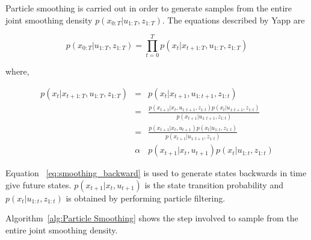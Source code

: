 \documentclass[12pt]{dalcsthesis}
\begin{document}
Particle smoothing is carried out in order to generate samples from the entire joint smoothing density $p(x_{0:T}|u_{1:T},z_{1:T})$. 
The equations described by Yapp \cite{Yap2008} are

\begin{equation}
p(x_{0:T}|u_{1:T},z_{1:T})=\prod_{t=0}^{T}p(x_{t}|x_{t+1:T},u_{1:T},z_{1:T})
\end{equation}

where,

\begin{eqnarray}
p(x_{t}|x_{t+1:T},u_{1:T},z_{1:T}) & = & p(x_{t}|x_{t+1},u_{1:t+1},z_{1:t})\\
 & = & \frac{p(x_{t+1}|x_{t},u_{1:t+1},z_{1:t})p(x_{t}|u_{1:t+1},z_{1:t})}{p(x_{t+1}|u_{1:t+1},z_{1:t})}\\
 & = & \frac{p(x_{t+1}|x_{t},u_{t+1})p(x_{t}|u_{1:t},z_{1:t})}{p(x_{t+1}|u_{1:t+1},z_{1:t})}\\
\label{eq:smoothing_backward} & \alpha & p(x_{t+1}|x_{t},u_{t+1})p(x_{t}|u_{1:t},z_{1:t})
\end{eqnarray}

Equation ~\ref{eq:smoothing_backward} is used to generate states backwards in time give future states. $p(x_{t+1}|x_{t},u_{t+1})$ is the state transition probability and $p(x_{t}|u_{1:t},z_{1:t})$ is obtained by performing particle filtering. 

Algorithm~\ref{alg:Particle Smoothing} shows the step involved to sample from the entire joint smoothing density.
\end{document}

